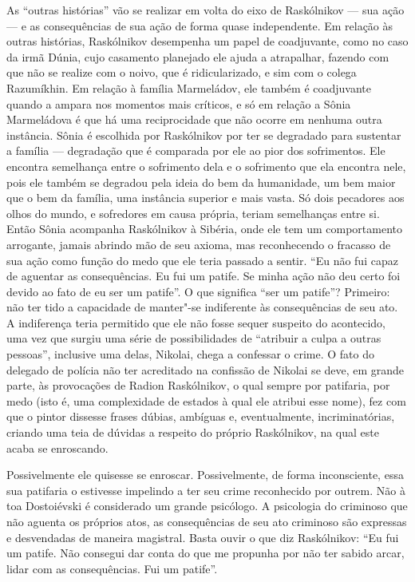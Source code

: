 As ``outras histórias'' vão se realizar em volta do eixo de Raskólnikov
--- sua ação --- e as consequências de sua ação de forma quase
independente. Em relação às outras histórias, Raskólnikov desempenha um
papel de coadjuvante, como no caso da irmã Dúnia, cujo casamento
planejado ele ajuda a atrapalhar, fazendo com que não se realize com o
noivo, que é ridicularizado, e sim com o colega Razumíkhin. Em relação à
família Marmeládov, ele também é coadjuvante quando a ampara nos
momentos mais críticos, e só em relação a Sônia Marmeládova é que há uma
reciprocidade que não ocorre em nenhuma outra instância. Sônia é
escolhida por Raskólnikov por ter se degradado para sustentar a família
--- degradação que é comparada por ele ao pior dos sofrimentos. Ele
encontra semelhança entre o sofrimento dela e o sofrimento que ela
encontra nele, pois ele também se degradou pela ideia do bem da
humanidade, um bem maior que o bem da família, uma instância superior e
mais vasta. Só dois pecadores aos olhos do mundo, e sofredores em causa
própria, teriam semelhanças entre si. Então Sônia acompanha Raskólnikov
à Sibéria, onde ele tem um comportamento arrogante, jamais abrindo mão
de seu axioma, mas reconhecendo o fracasso de sua ação como função do
medo que ele teria passado a sentir. ``Eu não fui capaz de aguentar as
consequências. Eu fui um patife. Se minha ação não deu certo foi devido
ao fato de eu ser um patife''. O que significa ``ser um patife''?
Primeiro: não ter tido a capacidade de manter"-se indiferente às
consequências de seu ato. A indiferença teria permitido que ele não
fosse sequer suspeito do acontecido, uma vez que surgiu uma série de
possibilidades de ``atribuir a culpa a outras pessoas'', inclusive uma
delas, Nikolai, chega a confessar o crime. O fato do delegado de
polícia não ter acreditado na confissão de Nikolai se deve, em grande
parte, às provocações de Radion Raskólnikov, o qual sempre por
patifaria, por medo (isto é, uma complexidade de estados à qual ele
atribui esse nome), fez com que o pintor dissesse frases dúbias,
ambíguas e, eventualmente, incriminatórias, criando uma teia de dúvidas
a respeito do próprio Raskólnikov, na qual este acaba se enroscando.

Possivelmente ele quisesse se enroscar. Possivelmente, de forma
inconsciente, essa sua patifaria o estivesse impelindo a ter seu crime
reconhecido por outrem. Não à toa Dostoiévski é considerado um grande
psicólogo. A psicologia do criminoso que não aguenta os próprios atos,
as consequências de seu ato criminoso são expressas e desvendadas de
maneira magistral. Basta ouvir o que diz Raskólnikov: ``Eu fui um
patife. Não consegui dar conta do que me propunha por não ter sabido
arcar, lidar com as consequências. Fui um patife''.

